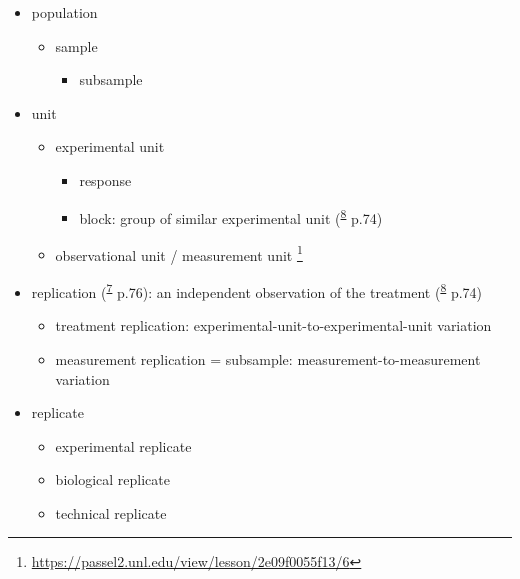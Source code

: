 \documentclass[
]{book}
\providecommand{\tightlist}{%
  \setlength{\itemsep}{0pt}\setlength{\parskip}{0pt}}
\theoremstyle{definition}
\theoremstyle{definition}
\theoremstyle{definition}
\theoremstyle{definition}
\theoremstyle{remark}
\begin{document}
\begin{itemize}
\tightlist
\item
  population

  \begin{itemize}
  \tightlist
  \item
    sample

    \begin{itemize}
    \tightlist
    \item
      subsample
    \end{itemize}
  \end{itemize}
\item
  unit

  \begin{itemize}
  \tightlist
  \item
    experimental unit

    \begin{itemize}
    \tightlist
    \item
      response
    \item
      block: group of similar experimental unit (\textsuperscript{\protect\hyperlink{ref-milliken2004}{8}} p.74)
    \end{itemize}
  \item
    observational unit / measurement unit \footnote{\url{https://passel2.unl.edu/view/lesson/2e09f0055f13/6}}
  \end{itemize}
\item
  replication (\textsuperscript{\protect\hyperlink{ref-hu2022}{7}} p.76): an independent observation of the treatment (\textsuperscript{\protect\hyperlink{ref-milliken2004}{8}} p.74)

  \begin{itemize}
  \tightlist
  \item
    treatment replication: experimental-unit-to-experimental-unit variation
  \item
    measurement replication = subsample: measurement-to-measurement variation
  \end{itemize}
\item
  replicate

  \begin{itemize}
  \tightlist
  \item
    experimental replicate
  \item
    biological replicate
  \item
    technical replicate
  \end{itemize}
\end{itemize}
\end{document}
